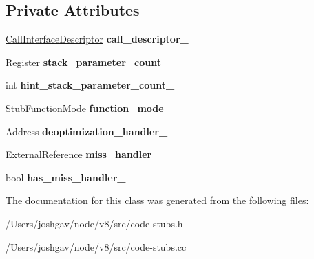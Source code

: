 \subsection*{Private Attributes}
\begin{DoxyCompactItemize}
\item 
\hyperlink{classv8_1_1internal_1_1_call_interface_descriptor}{Call\+Interface\+Descriptor} {\bfseries call\+\_\+descriptor\+\_\+}\hypertarget{classv8_1_1internal_1_1_code_stub_descriptor_a1c2a50229a30d82bcf7418959e2f39d0}{}\label{classv8_1_1internal_1_1_code_stub_descriptor_a1c2a50229a30d82bcf7418959e2f39d0}

\item 
\hyperlink{structv8_1_1internal_1_1_register}{Register} {\bfseries stack\+\_\+parameter\+\_\+count\+\_\+}\hypertarget{classv8_1_1internal_1_1_code_stub_descriptor_a9675bf4685864301614f9f7ee7ce0147}{}\label{classv8_1_1internal_1_1_code_stub_descriptor_a9675bf4685864301614f9f7ee7ce0147}

\item 
int {\bfseries hint\+\_\+stack\+\_\+parameter\+\_\+count\+\_\+}\hypertarget{classv8_1_1internal_1_1_code_stub_descriptor_a425f577b38dede3ed54b01afaf5f553f}{}\label{classv8_1_1internal_1_1_code_stub_descriptor_a425f577b38dede3ed54b01afaf5f553f}

\item 
Stub\+Function\+Mode {\bfseries function\+\_\+mode\+\_\+}\hypertarget{classv8_1_1internal_1_1_code_stub_descriptor_a0ba499ea7d97e6a8ef646eddbb28e421}{}\label{classv8_1_1internal_1_1_code_stub_descriptor_a0ba499ea7d97e6a8ef646eddbb28e421}

\item 
Address {\bfseries deoptimization\+\_\+handler\+\_\+}\hypertarget{classv8_1_1internal_1_1_code_stub_descriptor_a0171aeba5914630dcb1e119f7e2ec07a}{}\label{classv8_1_1internal_1_1_code_stub_descriptor_a0171aeba5914630dcb1e119f7e2ec07a}

\item 
External\+Reference {\bfseries miss\+\_\+handler\+\_\+}\hypertarget{classv8_1_1internal_1_1_code_stub_descriptor_a33e0102609c4c2d301d9c68c18c70cc2}{}\label{classv8_1_1internal_1_1_code_stub_descriptor_a33e0102609c4c2d301d9c68c18c70cc2}

\item 
bool {\bfseries has\+\_\+miss\+\_\+handler\+\_\+}\hypertarget{classv8_1_1internal_1_1_code_stub_descriptor_a72ca924ac7769f9fd5128d11bb48a501}{}\label{classv8_1_1internal_1_1_code_stub_descriptor_a72ca924ac7769f9fd5128d11bb48a501}

\end{DoxyCompactItemize}


The documentation for this class was generated from the following files\+:\begin{DoxyCompactItemize}
\item 
/\+Users/joshgav/node/v8/src/code-\/stubs.\+h\item 
/\+Users/joshgav/node/v8/src/code-\/stubs.\+cc\end{DoxyCompactItemize}
